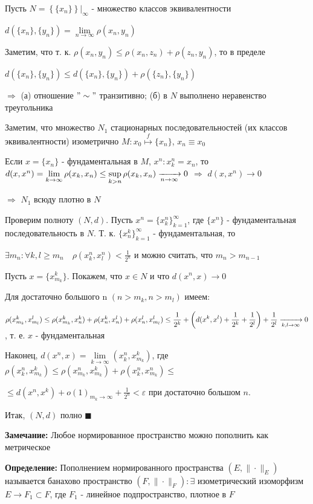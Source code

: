 \documentclass[a4paper]{report}
\newcommand*{\hm}[1]{#1\nobreak\discretionary{}%
            {\hbox{$\mathsurround=0pt #1$}}{}}
\begin{document}
Пусть $N=\left\{\{x_n\}\right\}|_\infty$ - множество классов эквивалентности

$d(\{x_n\},\{y_n\})=\lim\limits_{n\to\infty}\rho(x_n,y_n)$

Заметим, что т. к. $\rho(x_n,y_n)\le\rho(x_n,z_n)+\rho(z_n,y_n)$, то в пределе 

$d(\{x_n\},\{y_n\})\le d(\{x_n\},\{y_n\})+\rho(\{z_n\},\{y_n\})$

$\Rightarrow$ (а) отношение $"\sim"$ транзитивно; (б) в $N$ выполнено неравенство треугольника

Заметим, что множество $N_1$ стационарных последовательностей (их классов эквивалентности) изометрично $M\colon
x_0\stackrel{f}{\longmapsto}\{x_n\}$, $x_n\equiv x_0$

Если $x=\{x_n\}$ - фундаментальная в $M$, $x^n\colon x_k^n=x_n$, то $d(x,x^n)\hm=\lim\limits_{k\to\infty}\rho(x_k,x_n)\le
\sup\limits_{k>n}\rho(x_k,x_n)\xrightarrow[n\to\infty]{}0$ $\Rightarrow$ $d(x,x^n)\to0$ 

$\Rightarrow$ $N_1$ всюду плотно в $N$

Проверим полноту $(N,d)$. Пусть $x^n=\{x_k^n\}_{k=1}^\infty$, где $\{x^n\}$ - фундаментальная последовательность в $N$. 
Т. к. $\{x_n^k\}_{k=1}^\infty$ - фундаментальная, то

 $\exists m_n\colon\forall k,l\ge m_n\quad\rho(x_k^n,x_l^n)<\displaystyle\frac{1}{2^n}$
и можно считать, что $m_n>m_{n-1}$

Пусть $x=\{x_{m_k}^k\}$. Покажем, что $x\in N$ и что $d(x^n,x)\to0$

Для достаточно большого n $(n>m_k,n>m_l)$ имеем: 

$\rho(x_{m_k}^k,x_{m_l}^l)\le\rho(x_{m_k}^k,x_n^k)+\rho(x_n^k,x_n^l)+\rho(x_n^l,x_{m_l}^l)\displaystyle\le\frac{1}{2^k}+\left(d(x^k,x^l)+
\displaystyle\frac{1}{2^k}+\frac{1}{2^l}\right)\hm+\displaystyle\frac{1}{2^l}\xrightarrow[k,l\to\infty]{}0$, т. е. $x$ - фундаментальная

Наконец, $d(x^n,x)=\lim\limits_{k\to\infty}(x_k^n,x_{m_k}^k)$, где $\rho(x_k^n,x_{m_k}^k)\le\rho(x_{m_k}^n,x_{m_k}^k)+
\rho(x_k^n,x_{m_k}^n)\le$

\noindent$\le d(x^n,x^k)+o(1)_{m_k\to\infty}+\displaystyle\frac{1}{2^n}<\varepsilon$ при достаточно большом $n$.

Итак, $(N,d)$ полно $\blacksquare$
\bigskip

\noindent\textbf{Замечание:} Любое нормированное пространство можно пополнить как метрическое
\bigskip

\noindent\textbf{Определение:} Пополнением нормированного пространства $(E,\|\cdot\|_E)$ называется банахово пространство 
$(F,\|\cdot\|_F)\colon\exists$ изометрический изоморфизм $E\to F_1\subset F$, где $F_1$ - линейное подпространство, 
плотное в $F$
\bigskip
\end{document}
